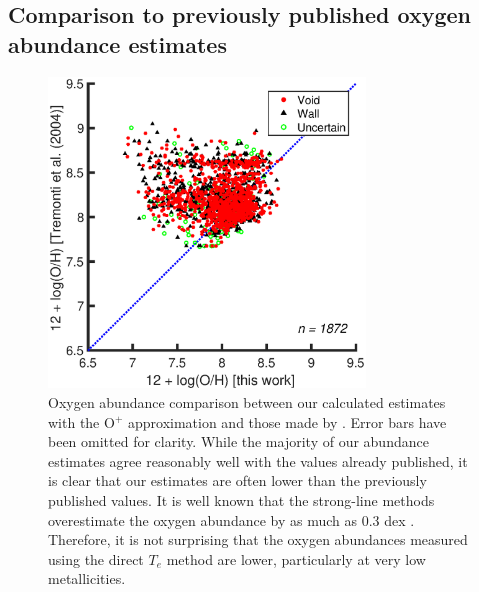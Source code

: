 \subsection{Comparison to previously published oxygen abundance estimates}

\begin{figure}
    \centering
    \includegraphics[width=0.75\textwidth]{Images/Paper3/1sig_dwarf_I06relations_SF_t3_T04comparison_dust}
    \caption[Comparison of O$^+$ approximation metallicities to 
    \cite{Tremonti04}]{Oxygen abundance comparison between our calculated 
    estimates with the O$^+$ approximation and those made by \cite{Tremonti04}.  
    Error bars have been omitted for clarity.  While the majority of our 
    abundance estimates agree reasonably well with the values already published, 
    it is clear that our estimates are often lower than the previously published 
    values.  It is well known that the strong-line methods \citep[like those 
    used by][]{Tremonti04} overestimate the oxygen abundance by as much as 0.3 
    dex \citep{Kennicutt03}.  Therefore, it is not surprising that the oxygen 
    abundances measured using the direct $T_e$ method are lower, particularly at 
    very low metallicities.}
    \label{fig:T04_comp}
\end{figure}

